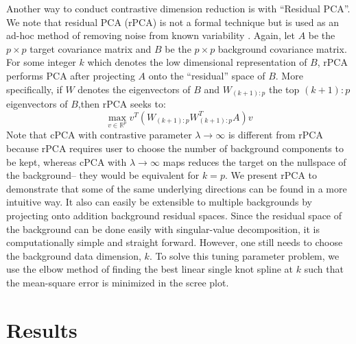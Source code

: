 \documentclass[12pt]{article}
\begin{document}
Another way to conduct contrastive dimension reduction is with ``Residual PCA''. We note that residual PCA (rPCA) is not a formal technique but is used as an ad-hoc method of removing noise from known variability  \cite{rpca}. Again, let $A$ be the $p \times p$ target covariance matrix and $B$ be the $p\times p$ background covariance matrix.  For some integer $k$ which denotes the low dimensional representation of $B$, rPCA performs PCA after projecting $A$ onto the ``residual'' space of $B$. More specifically, if $W$ denotes the eigenvectors of $B$ and $W_{(k+1):p}$ the top $(k+1):p$ eigenvectors of $B$,then rPCA seeks to:
\[\max_{v\in \mathbb{R}^p}{v^T \left(W_{(k+1):p}W_{(k+1):p}^T A\right) v}\]
Note that cPCA with contrastive parameter $\lambda \rightarrow \infty$ is different from rPCA because rPCA requires user to choose the number of background components to be kept, whereas cPCA with $\lambda \rightarrow \infty$ maps reduces the target on the nullspace of the background-- they would be equivalent for $k = p$. We present rPCA to demonstrate that some of the same underlying directions can be found in a more intuitive way. It also can easily be extensible to multiple backgrounds by projecting onto addition background residual spaces. Since the residual space of the background can be done easily with singular-value decomposition, it is computationally simple and straight forward. However, one still needs to choose the background data dimension, $k$.
To solve this tuning parameter problem, we use the elbow method of finding the best linear single knot spline at $k$ such that the mean-square error is minimized in the scree plot.%
   
   
   
\section{Results}
\end{document}
